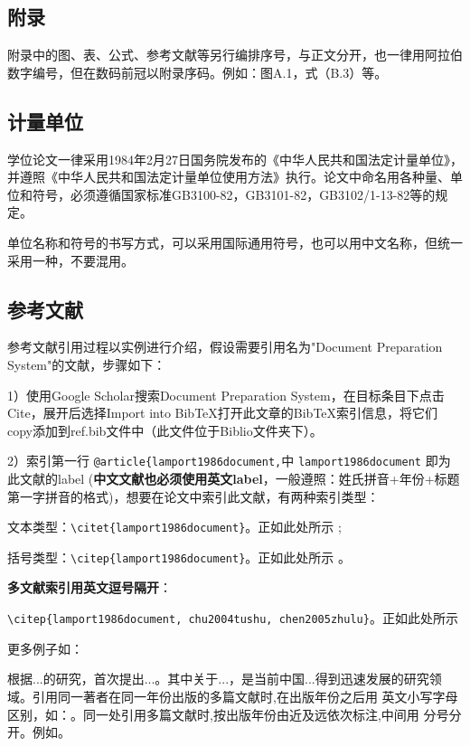 \subsection{附录}
附录中的图、表、公式、参考文献等另行编排序号，与正文分开，也一律用阿拉伯数字编号，但在数码前冠以附录序码。例如：图A.1，式（B.3）等。
\subsection{计量单位}
学位论文一律采用1984年2月27日国务院发布的《中华人民共和国法定计量单位》，并遵照《中华人民共和国法定计量单位使用方法》执行。论文中命名用各种量、单位和符号，必须遵循国家标准GB3100-82，GB3101-82，GB3102/1-13-82等的规定。

单位名称和符号的书写方式，可以采用国际通用符号，也可以用中文名称，但统一采用一种，不要混用。

\subsection{参考文献}

参考文献引用过程以实例进行介绍，假设需要引用名为"Document Preparation System"的文献，步骤如下：

1）使用Google Scholar搜索Document Preparation System，在目标条目下点击Cite，展开后选择Import into BibTeX打开此文章的BibTeX索引信息，将它们copy添加到ref.bib文件中（此文件位于Biblio文件夹下）。

2）索引第一行 \verb|@article{lamport1986document,|中 \verb|lamport1986document| 即为此文献的label (\textbf{中文文献也必须使用英文label}，一般遵照：姓氏拼音+年份+标题第一字拼音的格式)，想要在论文中索引此文献，有两种索引类型：

文本类型：\verb|\citet{lamport1986document}|。正如此处所示 \citet{lamport1986document}; 

括号类型：\verb|\citep{lamport1986document}|。正如此处所示 \citep{lamport1986document}。

\textbf{多文献索引用英文逗号隔开}：

\verb|\citep{lamport1986document, chu2004tushu, chen2005zhulu}|。正如此处所示 \citep{lamport1986document,chu2004tushu,chen2005zhulu}

更多例子如：

\citet{walls2013drought}根据...的研究，首次提出...。其中关于...\citep{walls2013drought}，是当前中国...得到迅速发展的研究领域\citep{chen1980zhongguo}。引用同一著者在同一年份出版的多篇文献时,在出版年份之后用
英文小写字母区别，如：\citep{yuan2012lana,yuan2012lanb,yuan2012lanc}。同一处引用多篇文献时,按出版年份由近及远依次标注,中间用
分号分开。例如\citep{chen1980zhongguo,stamerjohanns2009mathml,hls2012jinji,niu2013zonghe}。

